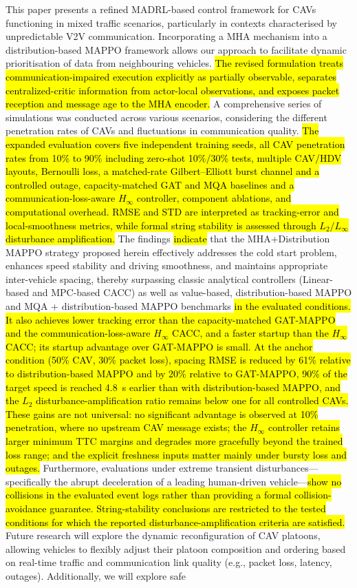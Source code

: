 \documentclass{ieeeaccess}
\begin{document}
This paper presents a refined MADRL-based control framework for CAVs functioning in mixed traffic scenarios, particularly in contexts characterised by unpredictable V2V communication. Incorporating a MHA mechanism into a distribution-based MAPPO framework allows our approach to facilitate dynamic prioritisation of data from neighbouring vehicles. \hl{The revised formulation treats communication-impaired execution explicitly as partially observable, separates centralized-critic information from actor-local observations, and exposes packet reception and message age to the MHA encoder.} A comprehensive series of simulations was conducted across various scenarios, considering the different penetration rates of CAVs and fluctuations in communication quality. \hl{The expanded evaluation covers five independent training seeds, all CAV penetration rates from 10\% to 90\% including zero-shot 10\%/30\% tests, multiple CAV/HDV layouts, Bernoulli loss, a matched-rate Gilbert--Elliott burst channel and a controlled outage, capacity-matched GAT and MQA baselines and a communication-loss-aware $H_\infty$ controller, component ablations, and computational overhead. RMSE and STD are interpreted as tracking-error and local-smoothness metrics, while formal string stability is assessed through $L_2/L_\infty$ disturbance amplification.} The findings \hl{indicate} that the MHA+Distribution MAPPO strategy proposed herein effectively addresses the cold start problem, enhances speed stability and driving smoothness, and maintains appropriate inter-vehicle spacing, thereby surpassing classic analytical controllers (Linear-based and MPC-based CACC) as well as value-based, distribution-based MAPPO and MQA + distribution-based MAPPO benchmarks \hl{in the evaluated conditions. It also achieves lower tracking error than the capacity-matched GAT-MAPPO and the communication-loss-aware $H_\infty$ CACC, and a faster startup than the $H_\infty$ CACC; its startup advantage over GAT-MAPPO is small. At the anchor condition (50\% CAV, 30\% packet loss), spacing RMSE is reduced by 61\% relative to distribution-based MAPPO and by 20\% relative to GAT-MAPPO, 90\% of the target speed is reached 4.8~s earlier than with distribution-based MAPPO, and the $L_2$ disturbance-amplification ratio remains below one for all controlled CAVs. These gains are not universal: no significant advantage is observed at 10\% penetration, where no upstream CAV message exists; the $H_\infty$ controller retains larger minimum TTC margins and degrades more gracefully beyond the trained loss range; and the explicit freshness inputs matter mainly under bursty loss and outages.} Furthermore, evaluations under extreme transient disturbances—specifically the abrupt deceleration of a leading human-driven vehicle—\hl{show no collisions in the evaluated event logs rather than providing a formal collision-avoidance guarantee. String-stability conclusions are restricted to the tested conditions for which the reported disturbance-amplification criteria are satisfied.} Future research will explore the dynamic reconfiguration of CAV platoons, allowing vehicles to flexibly adjust their platoon composition and ordering based on real-time traffic and communication link quality (e.g., packet loss, latency, outages). Additionally, we will explore safe 
\end{document}
